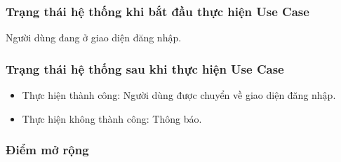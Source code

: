 \subsubsection{Trạng thái hệ thống khi bắt đầu thực hiện Use Case}
Người dùng đang ở giao diện đăng nhập.

\subsubsection{Trạng thái hệ thống sau khi thực hiện Use Case}
\begin{itemize}
  \item Thực hiện thành công: Người dùng được chuyển về giao diện đăng nhập.
  \item Thực hiện không thành công: Thông báo.
\end{itemize}

\subsubsection{Điểm mở rộng}